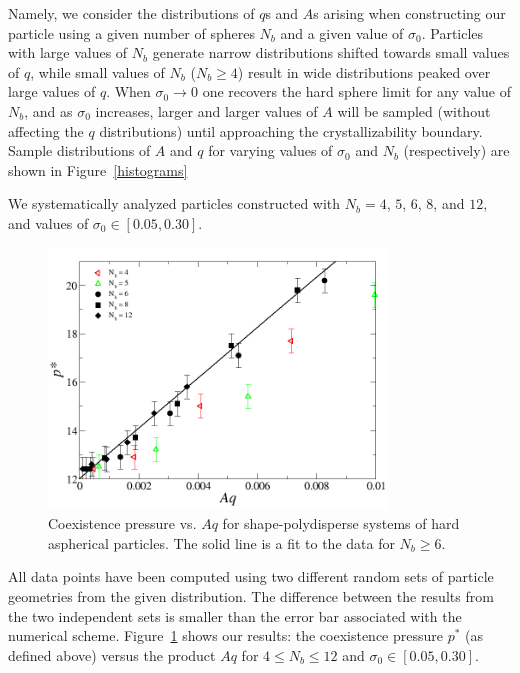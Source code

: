 Namely, we  consider the distributions of $q$s and $A$s arising when constructing our particle using a given number of spheres $N_b$ and a given value of $\sigma_0$.
Particles  with large values of $N_b$ generate narrow distributions shifted towards small values of $q$, while small values of $N_b$ ($N_b\geq 4$) result in wide distributions peaked over large values of $q$.
When $\sigma_0\rightarrow 0$ one recovers the  hard sphere limit for any value of $N_b$, and as $\sigma_0$ increases,  larger and larger values of $A$ will be sampled (without affecting the $q$ distributions) until approaching the crystallizability boundary.
Sample distributions of $A$ and $q$ for varying values of $\sigma_0$ and $N_b$ (respectively) are shown in Figure~\ref{histograms}

We systematically analyzed particles constructed with $N_b =4$, $5$, $6$, $8$, and $12$, and values of  $\sigma_0 \in[0.05,0.30]$.

\begin{figure}
	\begin{center}\includegraphics[width=0.8\textwidth]{polydisperse/poly.png}\end{center}
	\caption[Coexistence pressures for shape-polydisperse systems vs. $Aq$]{Coexistence pressure vs. $Aq$ for shape-polydisperse systems of hard aspherical particles. The solid line is a fit to the data for $N_b\geq 6$.}\label{poly}
\end{figure}
All data points have been computed using two different random sets of particle geometries from the given distribution.
The difference between the results from the two independent sets is smaller than the error bar associated with the numerical scheme.
Figure~\ref{poly} shows our results: the coexistence pressure $p^*$ (as defined above) versus the product $Aq$ for $4 \leq N_b \leq 12$ and $\sigma_0 \in [0.05,0.30]$.

